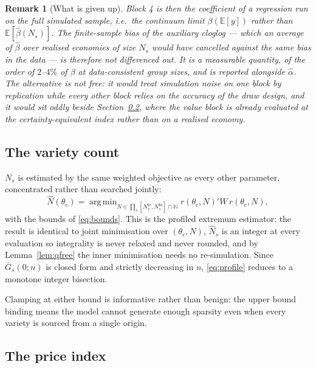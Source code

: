 \documentclass[11pt]{article}
\newtheorem{remark}{Remark}
\DeclareMathOperator*{\argmin}{arg\,min}
\newcommand{\E}{\mathbb{E}}
\begin{document}
\begin{remark}[What is given up]
\label{rem:binding}
Block 4 is then the coefficient of a regression run on the full simulated sample, i.e.\ the
continuum limit $\beta(\E[y])$ rather than $\E[\hat\beta(N_{s})]$. The finite-sample bias of the
auxiliary cloglog --- which an average of $\hat\beta$ over realised economies of size $N_{s}$ would
have cancelled against the same bias in the data --- is therefore not differenced out. It is a
measurable quantity, of the order of $2$--$4\%$ of $\beta$ at data-consistent group sizes, and is
reported alongside $\hat\alpha$. The alternative is not free: it would treat simulation noise on
one block by replication while every other block relies on the accuracy of the draw design, and it
would sit oddly beside Section~\ref{sec:priceindex}, where the value block is already evaluated at
the certainty-equivalent index rather than on a realised economy.
\end{remark}

\subsection{The variety count}

$N_{s}$ is estimated by the same weighted objective as every other parameter, concentrated rather
than searched jointly:
\begin{equation}
\widehat N(\theta_{c})=\argmin_{N\in\prod_{s}[N^{\mathrm{lo}}_{s},N^{\mathrm{hi}}_{s}]\cap\mathbb{N}}
r(\theta_{c},N)'W\,r(\theta_{c},N),
\label{eq:profile}
\end{equation}
with the bounds of \eqref{eq:bounds}. This is the profiled extremum estimator: the result is
identical to joint minimisation over $(\theta_{c},N)$, $\widehat N_{s}$ is an integer at every
evaluation so integrality is never relaxed and never rounded, and by Lemma~\ref{lem:qfree} the
inner minimisation needs no re-simulation. Since $\bar G_{s}(0;n)$ is closed form and strictly
decreasing in $n$, \eqref{eq:profile} reduces to a monotone integer bisection.

Clamping at either bound is informative rather than benign: the upper bound binding means the model
cannot generate enough sparsity even when every variety is sourced from a single origin.

\subsection{The price index}
\label{sec:priceindex}
\end{document}
